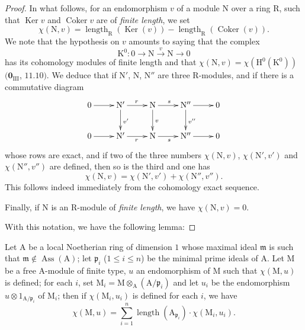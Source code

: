 \begin{proof}
In what follows, for an endomorphism $v$ of a module $\mathrm{N}$ over a ring $\mathrm{R}$, such that $\operatorname{Ker} v$ and $\operatorname{Coker} v$ are of \emph{finite length}, we set
\[
  \chi(\mathrm{N},v)=\operatorname{length}_{\mathrm{R}}(\operatorname{Ker}(v))-\operatorname{length}_{\mathrm{R}}(\operatorname{Coker}(v)).
\]
We note that the hypothesis on $v$ amounts to saying that the complex
\[
  \mathrm{K}^0:0\to\mathrm{N}\xrightarrow{v}\mathrm{N}\to 0
\]
has its cohomology modules of finite length and that $\chi(\mathrm{N},v)=\chi(\mathrm{H}^0(\mathrm{K}^0))$ $(\mathbf{0}_{\mathrm{III}}$, $11.10)$.
We deduce that if $\mathrm{N}'$, $\mathrm{N}$, $\mathrm{N}''$ are three $\mathrm{R}$-modules, and if there is a commutative diagram
\[
  \xymatrix{
    0 \ar[r] & \mathrm{N}' \ar[r]^r \ar[d]^{v'} & \mathrm{N} \ar[r]^s \ar[d]^v & \mathrm{N}'' \ar[r] \ar[d]^{v''} & 0\\
    0 \ar[r] & \mathrm{N}' \ar[r]_r & \mathrm{N} \ar[r]_s & \mathrm{N}'' \ar[r] & 0
  }
\]
whose rows are exact, and if two of the three numbers $\chi(\mathrm{N},v)$, $\chi(\mathrm{N}',v')$ and $\chi(\mathrm{N}'',v'')$ are defined, then so is the third and one has
\[
\label{IV.21.10.17.6}
  \chi(\mathrm{N},v)=\chi(\mathrm{N}',v')+\chi(\mathrm{N}'',v'').
  \tag{21.10.17.6}
\]
This follows indeed immediately from the cohomology exact sequence.

Finally, if $\mathrm{N}$ is an $\mathrm{R}$-module of \emph{finite length}, we have $\chi(\mathrm{N},v)=0$.

With this notation, we have the following lemma:
\end{proof}

\begin{lemma}[21.10.17.7]
\label{IV.21.10.17.7}
Let $\mathrm{A}$ be a local Noetherian ring of dimension $1$ whose maximal ideal $\mathfrak{m}$ is such that $\mathfrak{m}\notin\operatorname{Ass}(\mathrm{A})$; let $\mathfrak{p}_i$ ($1\leq i\leq n$) be the minimal prime ideals of $\mathrm{A}$.
Let $\mathrm{M}$ be a free A-module of finite type, $u$ an endomorphism of $\mathrm{M}$ such that $\chi(\mathrm{M},u)$ is defined; for each $i$, set $\mathrm{M}_i=\mathrm{M}\otimes_{\mathrm{A}}(\mathrm{A}/\mathfrak{p}_i)$ and let $u_i$ be the endomorphism $u\otimes 1_{\mathrm{A}/\mathfrak{p}_i}$ of $\mathrm{M}_i$; then if $\chi(\mathrm{M}_i,u_i)$ is defined for each $i$, we have
\[
\label{IV.21.10.17.8}
  \chi(\mathrm{M},u)=\sum_{i=1}^n\operatorname{length}(\mathrm{A}_{\mathfrak{p}_i})\cdot\chi(\mathrm{M}_i,u_i).
  \tag{21.10.17.8}
\]
\end{lemma}

